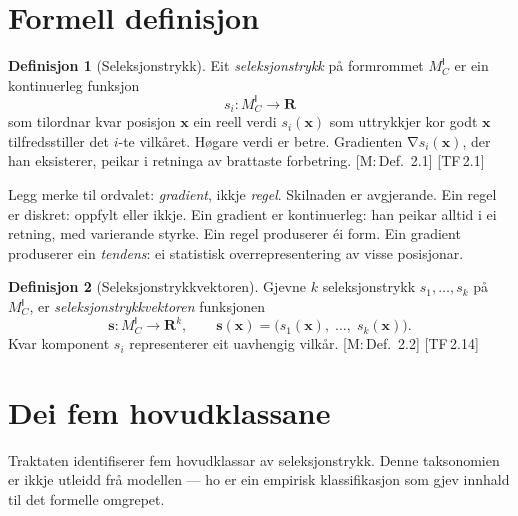 \documentclass[10pt]{book}
\theoremstyle{definition}
\newtheorem{definisjon}{Definisjon}[chapter]
\theoremstyle{plain}
\theoremstyle{remark}
\newcommand{\MC}{M^{\mathsf{I}}_C}
\providecommand{\R}{}
\renewcommand{\R}{\mathbf{R}}
\DeclareMathOperator{\grad}{\nabla}
\newcommand{\TF}[1]{\textnormal{[TF\,#1]}}
\newcommand{\Mref}[1]{\textnormal{[M:\,#1]}}
\begin{document}
\section{Formell definisjon}\label{sec:seleksjon:def}

\begin{definisjon}[Seleksjonstrykk]\label{def:seleksjon}
Eit \emph{seleksjonstrykk} p\aa{} formrommet $\MC$ er ein kontinuerleg funksjon
\[
  s_i : \MC \longrightarrow \R
\]
som tilordnar kvar posisjon $\bm{x}$ ein reell verdi $s_i(\bm{x})$ som uttrykkjer kor godt $\bm{x}$ tilfredsstiller det $i$-te vilk\aa ret. H\o gare verdi er betre. Gradienten $\grad s_i(\bm{x})$, der han eksisterer, peikar i retninga av brattaste forbetring. \Mref{Def.~2.1} \TF{2.1}
\end{definisjon}

Legg merke til ordvalet: \emph{gradient}, ikkje \emph{regel}. Skilnaden er avgjerande. Ein regel er diskret: oppfylt eller ikkje. Ein gradient er kontinuerleg: han peikar alltid i ei retning, med varierande styrke. Ein regel produserer \' ei form. Ein gradient produserer ein \emph{tendens}: ei statistisk overrepresentering av visse posisjonar.

\begin{definisjon}[Seleksjonstrykkvektoren]\label{def:selvektor}
Gjevne $k$ seleksjonstrykk $s_1, \ldots, s_k$ p\aa{} $\MC$, er \emph{seleksjonstrykk\-vektoren} funksjonen
\[
  \bm{s} : \MC \longrightarrow \R^k, \qquad
  \bm{s}(\bm{x}) = \bigl(s_1(\bm{x}),\; \ldots,\; s_k(\bm{x})\bigr).
\]
Kvar komponent $s_i$ representerer eit uavhengig vilk\aa r. \Mref{Def.~2.2} \TF{2.14}
\end{definisjon}

\section{Dei fem hovudklassane}\label{sec:seleksjon:klassar}

Traktaten identifiserer fem hovudklassar av seleksjonstrykk. Denne taksonomien er ikkje utleidd fr\aa{} modellen --- ho er ein empirisk klassifikasjon som gjev innhald til det formelle omgrepet.
\end{document}
